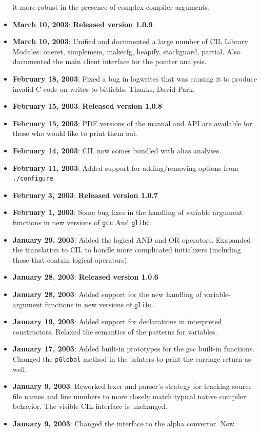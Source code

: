 \documentclass{article}
\def\t#1{{\tt #1}}
\begin{document}
\begin{itemize}
it more robust in the presence of complex compiler arguments. 
\item {\bf March 10, 2003}: {\bf Released version 1.0.9}
\item {\bf March 10, 2003}: Unified and documented a large number of CIL
Library Modules: oneret, simplemem, makecfg, heapify, stackguard, partial.
Also documented the main client interface for the pointer analysis. 
\item {\bf February 18, 2003}: Fixed a bug in logwrites that was causing it
to produce invalid C code on writes to bitfields. Thanks, David Park. 
\item {\bf February 15, 2003}: {\bf Released version 1.0.8}
\item {\bf February 15, 2003}: PDF versions of the manual and API are
available for those who would like to print them out. 
\item {\bf February 14, 2003}: CIL now comes bundled with alias analyses. 
\item {\bf February 11, 2003}: Added support for adding/removing options from
  \t{./configure}. 
\item {\bf February 3, 2003}: {\bf Released version 1.0.7}
\item {\bf February 1, 2003}: Some bug fixes in the handling of variable
argument functions in new versions of \t{gcc} And \t{glibc}. 
\item {\bf January 29, 2003}: Added the logical AND and OR operators.
Exapanded the translation to CIL to handle more complicated initializers
(including those that contain logical operators).
\item {\bf January 28, 2003}: {\bf Released version 1.0.6}
\item {\bf January 28, 2003}: Added support for the new handling of
variable-argument functions in new versions of \t{glibc}. 
\item {\bf January 19, 2003}: Added support for declarations in interpreted
  constructors. Relaxed the semantics of the patterns for variables. 
\item {\bf January 17, 2003}: Added built-in prototypes for the gcc built-in
  functions. Changed the \t{pGlobal} method in the printers to print the
  carriage return as well.
\item {\bf January 9, 2003}: Reworked lexer and parser's strategy for
  tracking source file names and line numbers to more closely match
  typical native compiler behavior.  The visible CIL interface is
  unchanged.
\item {\bf January 9, 2003}: Changed the interface to the alpha convertor. Now

\end{itemize}
\end{document}
